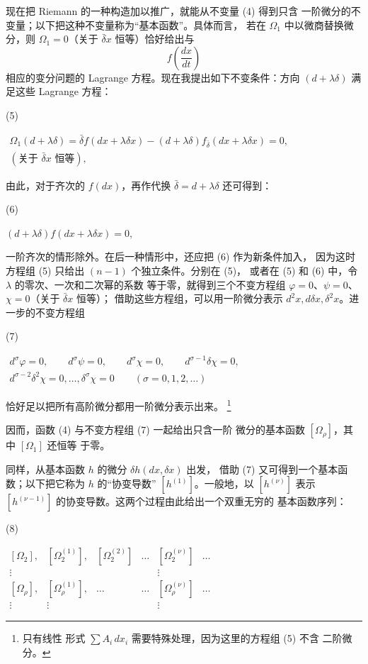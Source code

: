 \documentclass[11pt]{article}
\providecommand{\bdelta}{\bar{\delta}}
\providecommand{\srcfn}[2]{%
  \begingroup
  \renewcommand{\thefootnote}{#1}%
  \footnote{#2}%
  \addtocounter{footnote}{-1}%
  \endgroup}
\providecommand{\srcnumdisplay}[3][3.4em]{%
  \par\smallskip\noindent
  \begin{minipage}[t]{#1}\vspace*{0pt}#2\end{minipage}%
  \begin{minipage}[t]{\dimexpr\linewidth-#1\relax}\vspace*{0pt}\centering
  \(\displaystyle #3\)
  \end{minipage}\par\smallskip}
\begin{document}
现在把 Riemann 的一种构造加以推广，就能从不变量 (4) 得到只含
一阶微分的不变量；以下把这种不变量称为“基本函数”。具体而言，
若在 \(\Omega_1\) 中以微商替换微分，则 \(\Omega_1=0\)（关于
\(\bdelta x\) 恒等）恰好给出与
\[
f\!\left(\frac{dx}{dt}\right)
\]
相应的变分问题的 Lagrange 方程。现在我提出如下不变条件：方向
\((d+\lambda\delta)\) 满足这些 Lagrange 方程：
\srcnumdisplay{(5)}{%
\begin{gathered}
\Omega_1(d+\lambda\delta)=
\bdelta f(dx+\lambda\delta x)
-(d+\lambda\delta)f_{\bdelta}(dx+\lambda\delta x)=0,\\
(\text{关于 }\bdelta x\text{ 恒等}),
\end{gathered}
}
由此，对于齐次的 \(f(dx)\)，再作代换 \(\bdelta=d+\lambda\delta\)
还可得到：
\srcnumdisplay{(6)}{%
(d+\lambda\delta)f(dx+\lambda\delta x)=0,
}
一阶齐次的情形除外。在后一种情形中，还应把 (6) 作为新条件加入，
因为这时方程组 (5) 只给出 \((n-1)\) 个独立条件。分别在 (5)，
或者在 (5) 和 (6) 中，令 \(\lambda\) 的零次、一次和二次幂的系数
等于零，就得到三个不变方程组
\(\varphi=0\)、\(\psi=0\)、\(\chi=0\)（关于 \(\bdelta x\) 恒等）；
借助这些方程组，可以用一阶微分表示
\(d^2x,d\delta x,\delta^2x\)。进一步的不变方程组
\srcnumdisplay{(7)}{%
\begin{gathered}
d^\sigma\varphi=0,\qquad d^\sigma\psi=0,\qquad
d^\sigma\chi=0,\qquad d^{\sigma-1}\delta\chi=0,\\
d^{\sigma-2}\delta^2\chi=0,\ldots,\delta^\sigma\chi=0
\qquad(\sigma=0,1,2,\ldots)
\end{gathered}
}
恰好足以把所有高阶微分都用一阶微分表示出来。\srcfn{1)}{只有线性
形式 \(\sum A_i\,dx_i\) 需要特殊处理，因为这里的方程组 (5) 不含
二阶微分。} 因而，函数 (4) 与不变方程组 (7) 一起给出只含一阶
微分的基本函数 \([\Omega_\rho]\)，其中 \([\Omega_1]\) 还恒等
于零。

同样，从基本函数 \(h\) 的微分 \(\delta h(dx,\delta x)\) 出发，
借助 (7) 又可得到一个基本函数；以下把它称为 \(h\) 的“协变导数”
\([h^{(1)}]\)。一般地，以 \([h^{(\nu)}]\) 表示
\([h^{(\nu-1)}]\) 的协变导数。这两个过程由此给出一个双重无穷的
基本函数序列：
\srcnumdisplay{(8)}{%
\begin{array}{cccccc}
[\Omega_2], & [\Omega_2^{(1)}], & [\Omega_2^{(2)}] & \ldots
& [\Omega_2^{(\nu)}] & \ldots\\
\vdots &&&& \vdots&\\
{}[\Omega_\rho], & [\Omega_\rho^{(1)}], & \ldots & \ldots
& [\Omega_\rho^{(\nu)}] & \ldots\\
\vdots & \vdots &&& \vdots&
\end{array}
}
\end{document}
